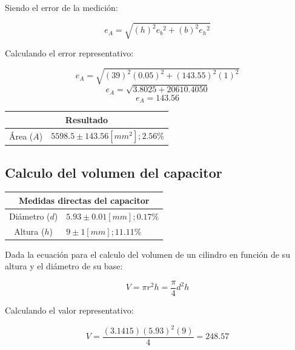 \documentclass[letter,11pt]{article}
\begin{document}
Siendo el error de la medición:

\begin{equation}
    e_A = \sqrt{
        \left(h\right)^2{e_{b}}^2+
        \left(b\right)^2{e_{h}}^2
    }
\end{equation}

Calculando el error representativo:

\begin{equation*}
    e_A = \sqrt{
        \left(39\right)^2(0.05)^2+
        \left(143.55\right)^2(1)^2
    }
\end{equation*}
\begin{equation*}
    e_A = \sqrt{3.8025+20610.4050}
\end{equation*}
\begin{equation*}
    e_A = 143.56
\end{equation*}

\begin{center}
\begin{tabular}{|c|>{\centering}m{5.0cm}<{\centering}|}
\hline
\multicolumn{2}{|c|}{\textbf{Resultado}}
\tabularnewline \hline
Área ($A$) & $5598.5\pm143.56[mm^2]; 2.56\%$ \tabularnewline \hline
\end{tabular}
\end{center}

\subsection{Calculo del volumen del capacitor}
\vspace*{0.25cm}
\begin{center}
\begin{tabular}{|c|>{\centering}m{5.0cm}<{\centering}|}
\hline
\multicolumn{2}{|c|}{\textbf{Medidas directas del capacitor}}
\tabularnewline \hline
Diámetro ($d$) & $5.93 \pm 0.01 [mm];  0.17\%$ \tabularnewline \hline
  Altura ($h$) & $9    \pm 1    [mm]; 11.11\%$ \tabularnewline \hline
\end{tabular}
\end{center}

Dada la ecuación para el calculo del volumen de un cilindro en función de su
altura y el diámetro de su base:

\begin{equation}
    V = \pi r^2 h = \frac{\pi}{4} d^2 h
\tag{cilindro}
\end{equation}

Calculando el valor representativo:

\begin{equation*}
    V = \frac{(3.1415)(5.93)^2(9)}{4} = 248.57
\end{equation*}
\end{document}
